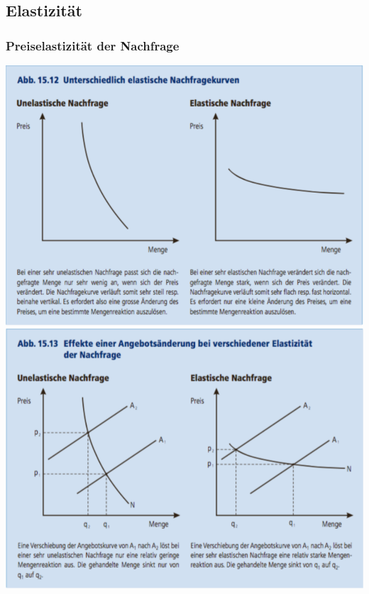 \subsection{Elastizität}

\subsubsection{Preiselastizität der Nachfrage}
\begin{multicols}{2}
\includegraphics[width=\linewidth]{images/elastischeNachfrage.png}
\columnbreak
\includegraphics[width=\linewidth]{images/elastischeNachfrage2.png}
\end{multicols}
